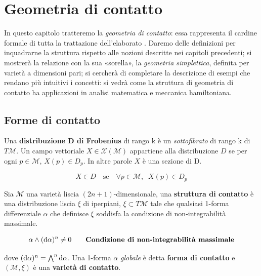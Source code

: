 \chapter{Geometria di contatto}

In questo capitolo tratteremo la \emph{geometria di contatto}: essa rappresenta il cardine formale di tutta la trattazione dell'elaborato \cite{jiang_thermodynamics}.
Daremo delle definizioni per inquadrarne la struttura rispetto alle nozioni descritte nei capitoli precedenti; si mostrerà la relazione con la sua «sorella», la \emph{geometria simplettica}, definita per varietà a dimensioni pari; si cercherà di completare la descrizione di esempi che rendano più intuitivi i concetti: si vedrà come la struttura di geometria di contatto ha applicazioni in analisi matematica e meccanica hamiltoniana.

\section{Forme di contatto}

\begin{definition}
    Una \textbf{distribuzione D di Frobenius} \cite{pirola_geometria} di rango k è un \emph{sottofibrato} di rango k di $T\mathcal{M}$.
    Un campo vettoriale $X \in \mathcal{X}(\mathcal{M})$ appartiene alla distribuzione $D$ se per ogni $p \in \mathcal{M}$, $X(p) \in D_p$. In altre parole $X$ è una sezione di D.
\end{definition}
\[
    X \in D \quad \mathrm{se} \quad \forall p \in \mathcal{M}, \; \;  X(p) \in D_p
\]

\begin{definition}
    Sia $\mathcal{M}$ una varietà liscia $(2n + 1)$-dimensionale, una \textbf{struttura di contatto} è una distribuzione liscia $\xi$ di iperpiani, $\xi \subset T \mathcal{M}$ tale che qualsiasi 1-forma differenziale $\alpha$ che definisce $\xi$ soddisfa la condizione di non-integrabilità massimale.

    \begin{equation}
        \alpha \wedge (\odif{\alpha})^n \neq 0 \tag*{\textbf{Condizione di non-integrabilità massimale}}
    \end{equation}

    dove $ (\odif{\alpha})^n = \bigwedge^n \odif{\alpha}$.
    Una 1-forma $\alpha$ \emph{globale} è detta \textbf{forma di contatto} e $(\mathcal{M}, \xi)$ è una \textbf{varietà di contatto}.
\end{definition}


